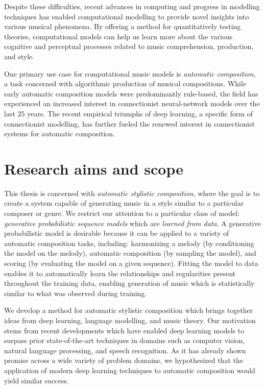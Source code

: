 Despite these difficulties, recent advances in computing and progress in
modelling techniques has enabled computational modelling to provide novel
insights into various musical phenomena. By offering a method for
quantitatively testing theories, computational models can help us learn more
about the various cognitive and perceptual processes related to music
comprehension, production, and style.

One primary use case for computational music models is \emph{automatic
composition}, a task concerned with algorithmic production of musical
compositions. While early automatic composition models were predominantly
rule-based, the field has experienced an increased interest in connectionist
neural-network models over the last $25$ years. The recent empirical triumphs
of deep learning, a specific form of connectionist modelling, has further
fueled the renewed interest in connectionist systems for automatic
composition.

\section{Research aims and scope}

This thesis is concerned with \emph{automatic stylistic composition}, where the
goal is to create a system capable of generating music in a style similar to a
particular composer or genre. We restrict our attention to a particular class
of model: \emph{generative probabilistic sequence models} which are
\emph{learned from data}. A generative probabilistic model is desirable because
it can be applied to a variety of automatic composition tasks, including:
harmonizing a melody (by conditioning the model on the melody), automatic
composition (by sampling the model), and scoring (by evaluating the model on a
given sequence). Fitting the model to data enables it to automatically learn
the relationships and regularities present throughout the training data,
enabling generation of music which is statistically similar to what was
observed during training.

We develop a method for automatic stylistic composition which brings together
ideas from deep learning, language modelling, and music theory. Our motivation
stems from recent developments
\citep{hinton2012improving,ioffe2015batch,el1995hierarchical,schmidhuber1992learning}
which have enabled deep learning models to surpass prior state-of-the-art
techniques in domains such as computer vision, natural language processing, and
speech recognition. As it has already shown promise across a wide variety of
problem domains, we hypothesized that the application of modern deep learning
techniques to automatic composition would yield similar success.

